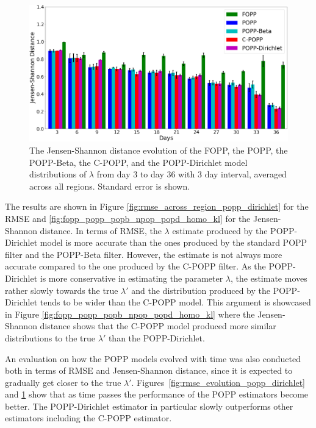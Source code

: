 \begin{figure}[t!]
	\centering
	\includegraphics[width=0.95\columnwidth]{./figures/fopp_popp_popb_npop_popd_homo_kl_evo.png}
	\caption{The Jensen-Shannon distance evolution of the FOPP, the POPP, the POPP-Beta, the C-POPP, and the POPP-Dirichlet model distributions of $\lambda$ from day 3 to day 36 with 3 day interval, averaged across all regions. Standard error is shown.}
	\label{fig:fopp_popp_popb_npop_popd_homo_kl_evo}
\end{figure}

The results are shown in Figure \ref{fig:rmse_across_region_popp_dirichlet} for the RMSE and \ref{fig:fopp_popp_popb_npop_popd_homo_kl} for the Jensen-Shannon distance. In terms of RMSE, the $\lambda$ estimate produced by the POPP-Dirichlet model is more accurate than the ones produced by the standard POPP filter and the POPP-Beta filter. However, the estimate is not always more accurate compared to the one produced by the C-POPP filter. As the POPP-Dirichlet is more conservative in estimating the parameter $\lambda$, the estimate moves rather slowly towards the true $\lambda'$ and the distribution produced by the POPP-Dirichlet tends to be wider than the C-POPP model. This argument is showcased in Figure \ref{fig:fopp_popp_popb_npop_popd_homo_kl} where the Jensen-Shannon distance shows that the C-POPP model produced more similar distributions to the true $\lambda'$ than the POPP-Dirichlet. 

An evaluation on how the POPP models evolved with time was also conducted both in terms of RMSE and Jensen-Shannon distance, since it is expected to gradually get closer to the true $\lambda'$. Figures~\ref{fig:rmse_evolution_popp_dirichlet} and \ref{fig:fopp_popp_popb_npop_popd_homo_kl_evo} show that as time passes the performance of the POPP estimators become better. The POPP-Dirichlet estimator in particular slowly outperforms other estimators including the C-POPP estimator.

